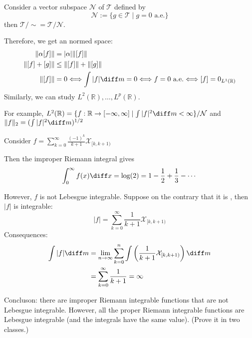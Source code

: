 Consider a vector subspace $\mathcal{N}$ of $\mathcal{T}$ defined by
\[
\mathcal{N}:=\{g\in\mathcal{T}\mid g=0\text{ a.e.}\}
\]
then $\mathcal{T}/\sim=\mathcal{T}/\mathcal{N}$.

Therefore, we get an normed space:
\begin{align*}
\|\alpha[f]\|&=|\alpha|\|[f]\|\\
\|[f]+[g]\|&\le \|[f]\|+\|[g]\|\\
\|[f]\|&=0
\Longleftrightarrow
\int|f|\diff m=0
\Longleftrightarrow
f=0\text{ a.e.}
\Longleftrightarrow
[f]=0_{L^1(\mathbb{R})}
\end{align*}
Similarly, we can study $L^2(\mathbb{R}),\dots,L^p(\mathbb{R})$.

For example, $L^2(\mathbb{R}) = \{f:\mathbb{R}\to[-\infty,\infty]\mid \int |f|^2\diff m<\infty\}/\mathcal{N}$ and $\|f\|_2=(\int|f|^2\diff m)^{1/2}$

\begin{example}
Consider $f = \sum_{k=0}^\infty \frac{(-1)^k}{k+1}\mathcal{X}_{[k,k+1)}$

Then the improper Riemann integral gives 
\[
\int_0^\infty f(x)\diff x=\log(2) = 1-\frac{1}{2}+\frac{1}{3}-\cdots
\]

However, $f$ is not Lebesgue integrable.
Suppose on the contrary that it is , then $|f|$ is integrable:
\[
|f| = \sum_{k=0}^\infty\frac{1}{k+1}\mathcal{X}_{[k,k+1)}
\]
Consequences:
\begin{align*}
\int|f|\diff m&=\lim_{n\to\infty}\sum_{k=0}^n\int\left(\frac{1}{k+1}\mathcal{X}_{[k,k+1)}\right)\diff m\\
&=\sum_{k=0}^\infty\frac{1}{k+1}=\infty
\end{align*}

Concluson:
there are improper Riemann integrable functions that are not Lebesgue integrable.
However, all the proper Riemann integrable functions are Lebesgue integrable (and the integrals have the same value). (Prove it in two classes.)
\end{example}

